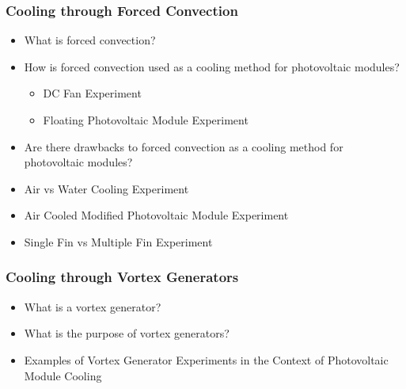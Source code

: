 \subsubsection{Cooling through Forced Convection}
\begin{itemize}
    \item What is forced convection?
    \item How is forced convection used as a cooling method for photovoltaic modules?
    \begin{itemize}
        \item DC Fan Experiment
        \item Floating Photovoltaic Module Experiment
    \end{itemize}
    \item Are there drawbacks to forced convection as a cooling method for photovoltaic modules?
    \item Air vs Water Cooling Experiment
    \item Air Cooled Modified Photovoltaic Module Experiment
    \item Single Fin vs Multiple Fin Experiment
\end{itemize}

\subsubsection{Cooling through Vortex Generators}
\begin{itemize}
    \item What is a vortex generator?
    \item What is the purpose of vortex generators?
    \item Examples of Vortex Generator Experiments in the Context of Photovoltaic Module Cooling
\end{itemize}